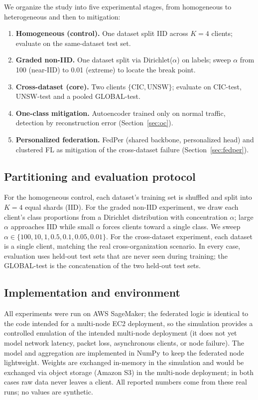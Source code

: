 \documentclass[11pt,a4paper]{article}
\begin{document}
We organize the study into five experimental stages, from homogeneous to
heterogeneous and then to mitigation:
\begin{enumerate}[leftmargin=1.6em]
  \item \textbf{Homogeneous (control).} One dataset split IID across \(K=4\)
  clients; evaluate on the same-dataset test set.
  \item \textbf{Graded non-IID.} One dataset split via Dirichlet(\(\alpha\)) on
  labels; sweep \(\alpha\) from 100 (near-IID) to 0.01 (extreme) to locate the
  break point.
  \item \textbf{Cross-dataset (core).} Two clients \(\{\text{CIC},\text{UNSW}\}\);
  evaluate on CIC-test, UNSW-test and a pooled GLOBAL-test.
  \item \textbf{One-class mitigation.} Autoencoder trained only on normal traffic,
  detection by reconstruction error (Section~\ref{sec:oc}).
  \item \textbf{Personalized federation.} FedPer (shared backbone, personalized
  head) and clustered FL as mitigation of the cross-dataset failure
  (Section~\ref{sec:fedper}).
\end{enumerate}

\subsection{Partitioning and evaluation protocol}
For the homogeneous control, each dataset's training set is shuffled and split
into \(K=4\) equal shards (IID). For the graded non-IID experiment, we draw each
client's class proportions from a Dirichlet distribution with concentration
\(\alpha\); large \(\alpha\) approaches IID while small \(\alpha\) forces clients
toward a single class. We sweep \(\alpha \in \{100,10,1,0.5,0.1,0.05,0.01\}\). For
the cross-dataset experiment, each dataset is a single client, matching the real
cross-organization scenario. In every case, evaluation uses held-out test sets
that are never seen during training; the GLOBAL-test is the concatenation of the
two held-out test sets.

\subsection{Implementation and environment}
All experiments were run on AWS SageMaker; the federated logic is identical to the
code intended for a multi-node EC2 deployment, so the simulation provides a
controlled emulation of the intended multi-node deployment (it does not yet model
network latency, packet loss, asynchronous clients, or node failure). The model
and aggregation are implemented in
NumPy to keep the federated node lightweight. Weights are exchanged in-memory in
the simulation and would be exchanged via object storage (Amazon S3) in the
multi-node deployment; in both cases raw data never leaves a client. All reported
numbers come from these real runs; no values are synthetic.
\end{document}
